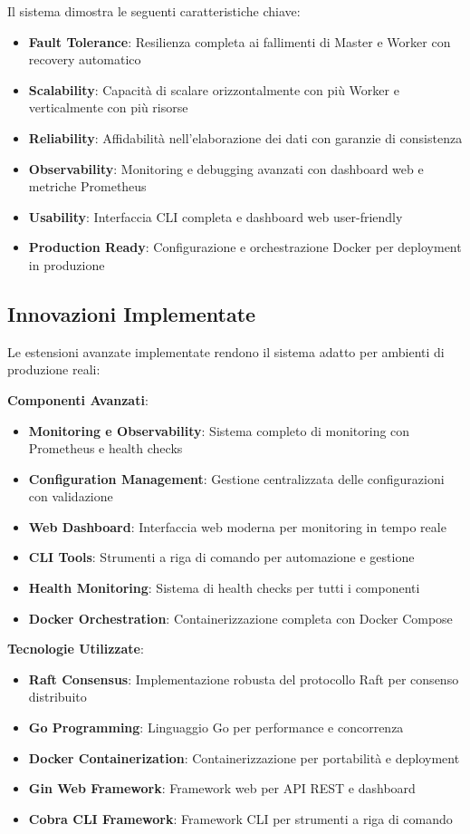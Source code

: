 \documentclass[12pt,a4paper]{article}
\begin{document}
Il sistema dimostra le seguenti caratteristiche chiave:

\begin{itemize}
\item \textbf{Fault Tolerance}: Resilienza completa ai fallimenti di Master e Worker con recovery automatico
\item \textbf{Scalability}: Capacità di scalare orizzontalmente con più Worker e verticalmente con più risorse
\item \textbf{Reliability}: Affidabilità nell'elaborazione dei dati con garanzie di consistenza
\item \textbf{Observability}: Monitoring e debugging avanzati con dashboard web e metriche Prometheus
\item \textbf{Usability}: Interfaccia CLI completa e dashboard web user-friendly
\item \textbf{Production Ready}: Configurazione e orchestrazione Docker per deployment in produzione
\end{itemize}

\subsection{Innovazioni Implementate}

Le estensioni avanzate implementate rendono il sistema adatto per ambienti di produzione reali:

\textbf{Componenti Avanzati}:
\begin{itemize}
\item \textbf{Monitoring e Observability}: Sistema completo di monitoring con Prometheus e health checks
\item \textbf{Configuration Management}: Gestione centralizzata delle configurazioni con validazione
\item \textbf{Web Dashboard}: Interfaccia web moderna per monitoring in tempo reale
\item \textbf{CLI Tools}: Strumenti a riga di comando per automazione e gestione
\item \textbf{Health Monitoring}: Sistema di health checks per tutti i componenti
\item \textbf{Docker Orchestration}: Containerizzazione completa con Docker Compose
\end{itemize}

\textbf{Tecnologie Utilizzate}:
\begin{itemize}
\item \textbf{Raft Consensus}: Implementazione robusta del protocollo Raft per consenso distribuito
\item \textbf{Go Programming}: Linguaggio Go per performance e concorrenza
\item \textbf{Docker Containerization}: Containerizzazione per portabilità e deployment
\item \textbf{Gin Web Framework}: Framework web per API REST e dashboard
\item \textbf{Cobra CLI Framework}: Framework CLI per strumenti a riga di comando
\end{itemize}
\end{document}
